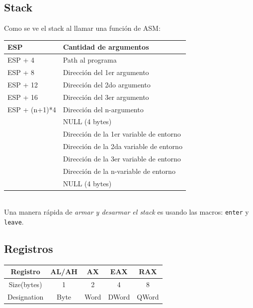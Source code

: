 \documentclass{article}
\begin{document}
\subsection{Stack}
Como se ve el stack al llamar una función de ASM:
\begin{table}[h]
\centering
\begin{tabular}{|l|l|}
\hline
ESP           & Cantidad de argumentos                  \\ \hline
ESP + 4       & Path al programa                        \\ \hline
ESP + 8       & Dirección del 1er argumento             \\ \hline
ESP + 12      & Dirección del 2do argumento             \\ \hline
ESP + 16      & Dirección del 3er argumento             \\ \hline
ESP + (n+1)*4 & Dirección del n-argumento               \\ \hline
\rowcolor[HTML]{FFCCC9} 
              & NULL (4 bytes)                          \\ \hline
              & Dirección de la 1er variable de entorno \\ \hline
              & Dirección de la 2da variable de entorno \\ \hline
              & Dirección de la 3er variable de entorno \\ \hline
              & Dirección de la n-variable de entorno   \\ \hline
\rowcolor[HTML]{FFCCC9} 
              & NULL (4 bytes)                          \\ \hline
\end{tabular}
\end{table}
\\Una manera rápida de \emph{armar y desarmar el stack} es usando las macros: \texttt{enter} y \texttt{leave}.

\subsection{Registros}
\begin{table}[h]
\centering
\begin{tabular}{|c|c|c|c|c|}
\hline
\rowcolor[HTML]{FFD43F} 
\cellcolor[HTML]{FFC702}Registro    & AL/AH & AX   & EAX   & RAX   \\ \hline
\cellcolor[HTML]{FFCB2F}Size(bytes) & 1     & 2    & 4     & 8     \\ \hline
\cellcolor[HTML]{FFCB2F}Designation & Byte  & Word & DWord & QWord \\ \hline
\end{tabular}
\end{table}
\end{document}
